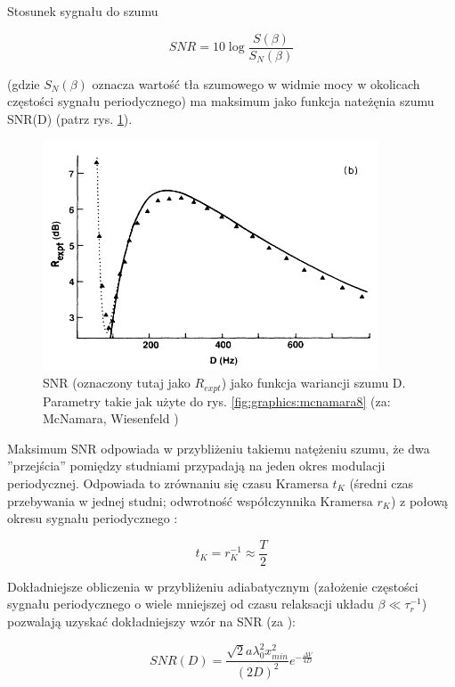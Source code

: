   Stosunek sygnału do szumu

  \begin{equation} \label{sr:snr}
    SNR = 10 \log \frac{S(\beta)}{S_N(\beta)}
  \end{equation}

  (gdzie $S_N(\beta)$ oznacza wartość tła szumowego w widmie mocy w okolicach częstości sygnału periodycznego) ma maksimum jako funkcja nateżęnia szumu SNR(D) (patrz rys. \ref{fig:graphics:mcnamara9b}).

  \begin{figure}
    \includegraphics[width=100mm]{images/mcnamara_9b.png}
    \caption{SNR (oznaczony tutaj jako $R_{expt}$) jako funkcja wariancji szumu D. Parametry takie jak użyte do rys. \ref{fig:graphics:mcnamara8} (za: McNamara, Wiesenfeld \cite{mcnamara})}
    \label{fig:graphics:mcnamara9b}
  \end{figure}

  Maksimum SNR odpowiada w przybliżeniu takiemu natężeniu szumu, że dwa ''przejścia'' pomiędzy studniami przypadają na jeden okres modulacji periodycznej. Odpowiada to zrównaniu się czasu Kramersa $t_K$ (średni czas przebywania w jednej studni; odwrotność współczynnika Kramersa $r_K$) z połową okresu sygnału periodycznego \cite{fauve}:

  \begin{equation} \label{sr:kramers}
    t_K = r_{K}^{-1} \approx \frac{T}{2}
  \end{equation}  

  Dokładniejsze obliczenia w przybliżeniu adiabatycznym (założenie częstości sygnału periodycznego o wiele mniejszej od czasu relaksacji układu $\beta \ll \tau^{-1}_r$) pozwalają uzyskać dokładniejszy wzór na SNR (za \cite{mcnamara}):

  \begin{equation} \label{sr:snr_theoretical}
    SNR(D) = \frac{\sqrt{2}a \lambda^{2}_0 x_{min}^2}{(2D)^2} e^{-\frac{\Delta V}{4D}}
  \end{equation}

